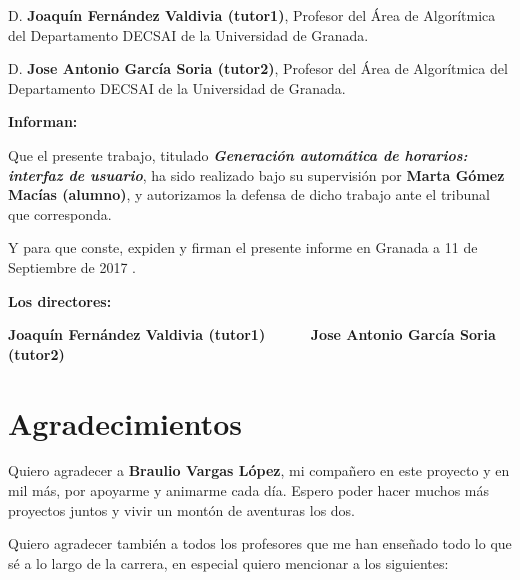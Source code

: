 D. \textbf{Joaquín Fernández Valdivia (tutor1)}, Profesor del Área de Algorítmica del Departamento DECSAI de la Universidad de Granada.

\vspace{0.5cm}

D. \textbf{Jose Antonio García Soria (tutor2)}, Profesor del Área de Algorítmica del Departamento DECSAI de la Universidad de Granada.


\vspace{0.5cm}

\textbf{Informan:}

\vspace{0.5cm}

Que el presente trabajo, titulado \textit{\textbf{Generación automática de horarios: interfaz de usuario}},
ha sido realizado bajo su supervisión por \textbf{Marta Gómez Macías (alumno)}, y autorizamos la defensa de dicho trabajo ante el tribunal
que corresponda.

\vspace{0.5cm}

Y para que conste, expiden y firman el presente informe en Granada a 11 de Septiembre de 2017 .

\vspace{1cm}

\textbf{Los directores:}

\vspace{5cm}

\noindent \textbf{Joaquín Fernández Valdivia (tutor1) \ \ \ \ \ Jose Antonio García Soria (tutor2)}

\chapter*{Agradecimientos}
\thispagestyle{empty}

       \vspace{1cm}


Quiero agradecer a \textbf{Braulio Vargas López}, mi compañero en este proyecto y en mil más, por apoyarme y animarme cada día. Espero poder hacer muchos más proyectos juntos y vivir un montón de aventuras los dos.

Quiero agradecer también a todos los profesores que me han enseñado todo lo que sé a lo largo de la carrera, en especial quiero mencionar a los siguientes:

